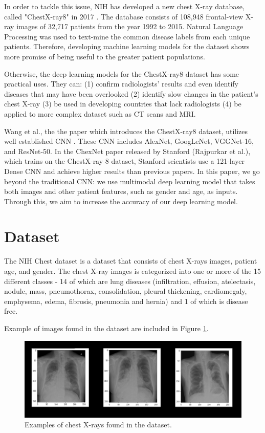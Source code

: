 \documentclass[10pt,letterpaper]{article}
\begin{document}
In order to tackle this issue, NIH has developed a new chest X-ray database, called "ChestX-ray8" in 2017 \cite{1705.02315}. The database consists of 108,948 frontal-view X-ray images of 32,717 patients from the year 1992 to 2015. Natural Language Processing was used to text-mine the common disease labels from each unique patients. Therefore, developing machine learning models for the dataset shows more promise of being useful to the greater patient populations.

Otherwise, the deep learning models for the ChestX-ray8 dataset has some practical uses. They can: (1) confirm radiologists' results and even identify diseases that may have been overlooked (2) identify slow changes in the patient's chest X-ray (3) be used in developing countries that lack radiologists (4) be applied to more complex dataset such as CT scans and MRI.

Wang et al., the the paper which introduces the ChestX-ray8 dataset, utilizes well established CNN \cite{1705.02315}. These CNN includes AlexNet, GoogLeNet, VGGNet-16, and ResNet-50. In the ChexNet paper released by Stanford (Rajpurkar et al.), which trains on the ChestX-ray 8 dataset, Stanford scientists use a 121-layer Dense CNN \cite{1711.05225} and achieve higher results than previous papers. In this paper, we go beyond the traditional CNN: we use multimodal deep learning model that takes both images and other patient features, such as gender and age, as inputs. Through this, we aim to increase the accuracy of our deep learning model.

\section{Dataset}
The NIH Chest dataset is a dataset that consists of chest X-rays images, patient age, and gender. 
The chest X-ray images is categorized into one or more of the 15 different classes - 14 of which are lung diseases (infiltration, effusion, atelectasis, nodule, mass, pneumothorax, consolidation, pleural thickening, cardiomegaly, emphysema, edema, fibrosis, pneumonia and hernia) and 1 of which is disease free.

Example of images found in the dataset are included in Figure \ref{dataset_example}.

\begin{figure}[h]
	\centering
	\includegraphics[scale=0.5]{./chestimages.png}
	\caption{Examples of chest X-rays found in the dataset.}
	\label{dataset_example}
\end{figure}
\end{document}
